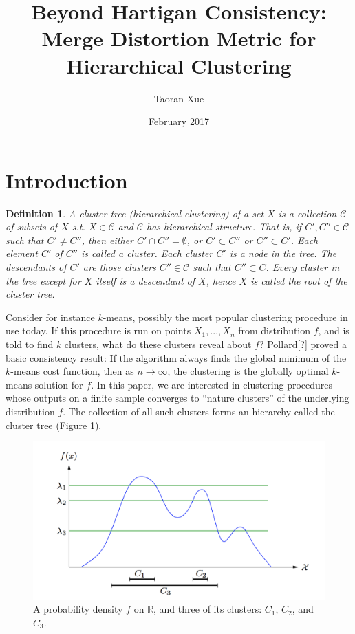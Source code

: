 \documentclass{article}
\title{Beyond Hartigan Consistency:
Merge Distortion Metric for Hierarchical Clustering}
\author{Taoran Xue }
\date{February 2017}
\newtheorem{definition}{Definition}
\begin{document}
\maketitle

\section{Introduction}

\begin{definition}
A cluster tree (hierarchical clustering) of a set $X$ is a collection $\mathcal C$ of subsets of $X$ s.t. $X \in \mathcal C$ and $\mathcal C$ has hierarchical structure. That is, if ${C}', {C}'' \in \mathcal C$ such that ${C}' \neq {C}''$, then either ${C}' \cap {C}'' = \emptyset $, or ${C}' \subset {C}''$ or ${C}'' \subset {C}'$. Each element $C'$ of $C''$ is called a cluster. Each cluster $C'$ is a node in the tree. The descendants of $C'$ are those clusters $C'' \in \mathcal C$ such that $C'' \subset C$. Every cluster in the tree except for $X$ itself is a descendant of $X$, hence $X$ is called the root of the cluster tree.
\end{definition}

Consider for instance $k$-means, possibly the most popular clustering procedure in use today. If this procedure is run on points $X_1, ... , X_n$ from distribution $f$, and is told to find $k$ clusters, what do these clusters reveal about $f$? {\color{red} Pollard[?] proved a basic consistency result: If the algorithm always finds the global minimum of the $k$-means cost function, then as $n \rightarrow \infty$, the clustering is the globally optimal $k$-means solution for $f$.} In this paper, we are interested in clustering procedures whose outputs on a finite sample converges to ``nature clusters'' of the underlying distribution $f$. The collection of all such clusters forms an hierarchy called the cluster tree (Figure \ref{fig:probdensity}).

\begin{figure}[h!]
\centering
\includegraphics[scale=0.4]{figure2.png}
\caption{A probability density $f$ on $\mathbb{R}$, and three of its clusters: $C_1$, $C_2$, and $C_3$.}
\label{fig:probdensity}
\end{figure}
\end{document}
